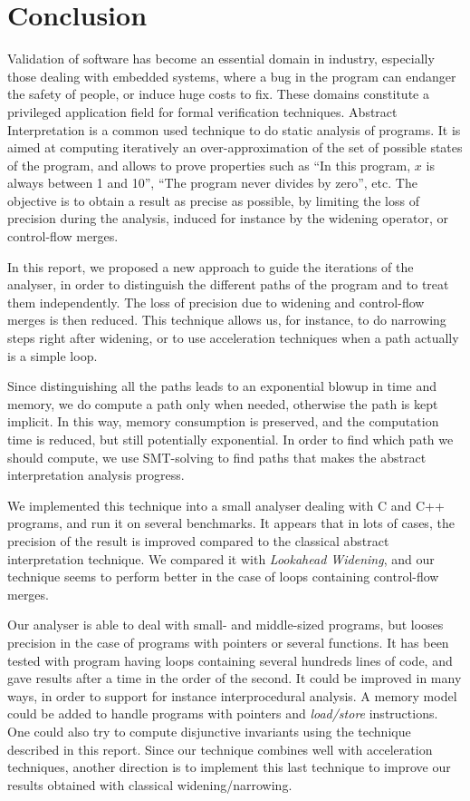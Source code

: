 \documentclass[a4paper,english,titlepage,11pt]{report}
\begin{document}
\chapter{Conclusion}
  
	Validation of software has become an essential domain in industry,
	especially those dealing with embedded systems, where a bug in the program
	can endanger the safety of people, or induce huge costs to fix. These
	domains constitute a privileged application field for formal verification
	techniques.
	Abstract Interpretation is a common used technique to do static analysis of
	programs. It is aimed at computing iteratively an over-approximation of the set of
	possible states of the program, and allows to prove properties such as
	``In this program, $x$ is always between 1 and 10'', ``The program never
	divides by zero'', etc. The objective is to obtain a result as precise as
	possible, by limiting the loss of precision during the analysis, induced for
	instance by the widening operator, or control-flow merges.

	In this report, we proposed a new approach to guide the iterations of the
	analyser, in order to distinguish the different paths of the program
	and to treat them
	independently. The loss of precision due to widening and control-flow merges
	is then reduced. This technique allows us, for instance, to do narrowing
	steps right after widening, or to use acceleration techniques when a path
	actually is a simple loop.

	Since distinguishing all the paths leads to an exponential blowup in time
	and memory, we do compute a path only when needed, otherwise the path is
	kept implicit. In this way, memory consumption is preserved, and the
	computation time is reduced, but still potentially exponential.
	In order to find which path we should compute, we use SMT-solving to find
	paths that makes the abstract interpretation analysis progress.

	We implemented this technique into a small analyser dealing with C and C++
	programs, and run it on several
	benchmarks.
	It appears that in lots of cases, 
	the precision of the result is improved 
	compared to the classical abstract interpretation technique.
	We compared it with \emph{Lookahead Widening}, and our technique seems to
	perform better in the case of loops containing control-flow merges. 

	Our analyser is able to deal with small- and middle-sized programs, but
	looses
	precision in the case of programs with pointers or several functions.
	It has been tested with program having loops containing several hundreds
	lines of code, and gave results after a time in the order of the second.
	It could be improved in many ways, in order to support
	for instance interprocedural analysis. A memory model could be added to
	handle programs with pointers and \emph{load/store} instructions.
	One could also try to compute disjunctive invariants using the technique
	described in this report.
	Since our technique combines well with acceleration techniques, another
	direction is to implement this last technique to improve our results
	obtained with classical widening/narrowing.
	
\end{document}
